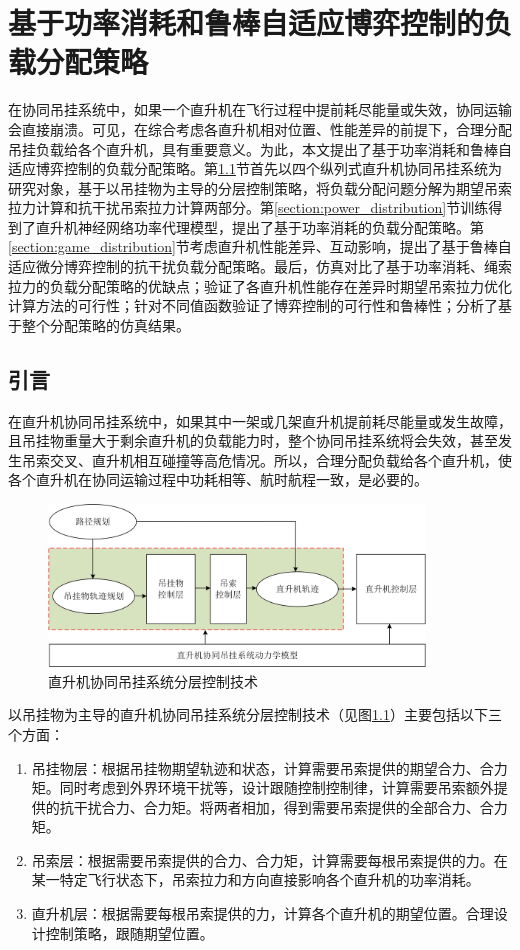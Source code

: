 \chapter{基于功率消耗和鲁棒自适应博弈控制的负载分配策略}
在协同吊挂系统中，如果一个直升机在飞行过程中提前耗尽能量或失效，协同运输会直接崩溃。可见，在综合考虑各直升机相对位置、性能差异的前提下，合理分配吊挂负载给各个直升机，具有重要意义。为此，本文提出了基于功率消耗和鲁棒自适应博弈控制的负载分配策略。第\ref{section:chap_4_introduction}节首先以四个纵列式直升机协同吊挂系统为研究对象，基于以吊挂物为主导的分层控制策略，将负载分配问题分解为期望吊索拉力计算和抗干扰吊索拉力计算两部分。第\ref{section:power_distribution}节训练得到了直升机神经网络功率代理模型，提出了基于功率消耗的负载分配策略。第\ref{section:game_distribution}节考虑直升机性能差异、互动影响，提出了基于鲁棒自适应微分博弈控制的抗干扰负载分配策略。最后，仿真对比了基于功率消耗、绳索拉力的负载分配策略的优缺点；验证了各直升机性能存在差异时期望吊索拉力优化计算方法的可行性；针对不同值函数验证了博弈控制的可行性和鲁棒性；分析了基于整个分配策略的仿真结果。

\section{引言}\label{section:chap_4_introduction}
在直升机协同吊挂系统中，如果其中一架或几架直升机提前耗尽能量或发生故障，且吊挂物重量大于剩余直升机的负载能力时，整个协同吊挂系统将会失效，甚至发生吊索交叉、直升机相互碰撞等高危情况。所以，合理分配负载给各个直升机，使各个直升机在协同运输过程中功耗相等、航时航程一致，是必要的。

\begin{figure}[!htb]  
  \includegraphics[width=10cm]{fig/figure_chap4/Chap4_1_1.png}
  \caption{直升机协同吊挂系统分层控制技术}
  \label{fig:4_1_1}
\end{figure}

以吊挂物为主导的直升机协同吊挂系统分层控制技术（见图\ref{fig:4_1_1}）主要包括以下三个方面：
\begin{enumerate}
  \item 吊挂物层：根据吊挂物期望轨迹和状态，计算需要吊索提供的期望合力、合力矩。同时考虑到外界环境干扰等，设计跟随控制控制律，计算需要吊索额外提供的抗干扰合力、合力矩。将两者相加，得到需要吊索提供的全部合力、合力矩。
  \item 吊索层：根据需要吊索提供的合力、合力矩，计算需要每根吊索提供的力。在某一特定飞行状态下，吊索拉力和方向直接影响各个直升机的功率消耗。
  \item 直升机层：根据需要每根吊索提供的力，计算各个直升机的期望位置。合理设计控制策略，跟随期望位置。
\end{enumerate}

